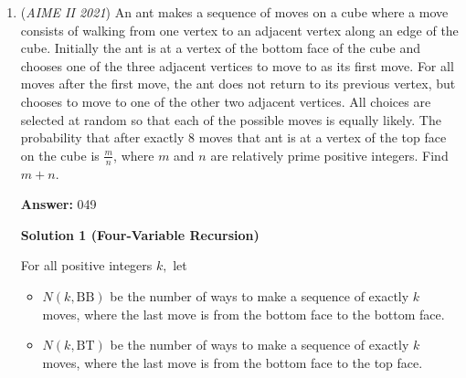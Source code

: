 \begin{enumerate}
 Multiplying both sides of $(2)$ by $c$ and factoring some terms gives us $abc + c^2 (a + b) = abc -3c^2 = -4c$. Testing $abc = -6$ will give us an imaginary solution for $c$, so therefore $abc = 20$ and $d = \frac{3}{2}$. This gets us $20 - 3c^2 = -4c$. Solving for $c$ gives us $c = \frac{3}{10}$ or $c = -2$. With a bit of testing, we can see that the correct value of $c$ is $c=-2$. Now we know $a+b = -3$ and $ab + bc + ca = ab + c(a+b) = ab + 6 = -4$, $ab = -10$, and it is obvious that $a = -5$ and $b = 2$ or the other way around, and therefore, $a^2 + b^2 + c^2 + d^2 = 25 + 4 + 4 + \frac{9}{4} = \frac{141}{4}$, giving us the answer $141 + 4 = \boxed{145}$.

 


	\item (\textit{AIME II 2021}) An ant makes a sequence of moves on a cube where a move consists of walking from one vertex to an adjacent vertex along an edge of the cube. Initially the ant is at a vertex of the bottom face of the cube and chooses one of the three adjacent vertices to move to as its first move. For all moves after the first move, the ant does not return to its previous vertex, but chooses to move to one of the other two adjacent vertices. All choices are selected at random so that each of the possible moves is equally likely. The probability that after exactly $8$ moves that ant is at a vertex of the top face on the cube is $\frac{m}{n}$, where $m$ and $n$ are relatively prime positive integers. Find $m + n.$

 \textbf{Answer: }049



\textbf{Solution 1 (Four-Variable Recursion)}

For all positive integers $k,$ let

 
            \begin{itemize}
        \item $N(k,\mathrm{BB})$ be the number of ways to make a sequence of exactly $k$ moves, where the last move is from the bottom face to the bottom face.
            \end{itemize}
            
            \begin{itemize}
        \item $N(k,\mathrm{BT})$ be the number of ways to make a sequence of exactly $k$ moves, where the last move is from the bottom face to the top face.
            \end{itemize}
            

\end{enumerate}
